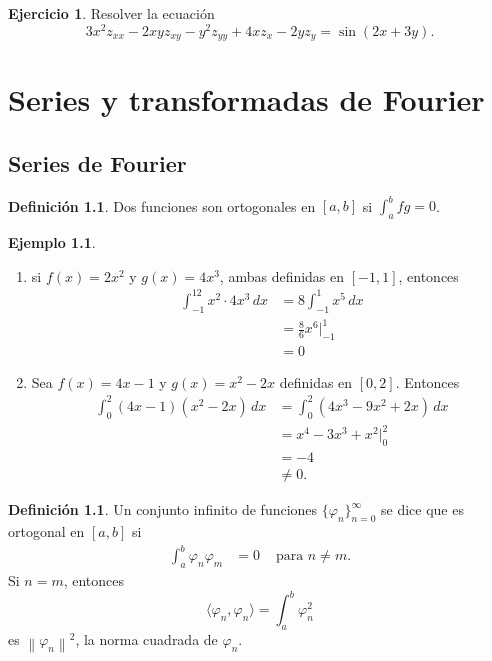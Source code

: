 \documentclass[11pt,letterpaper,draft]{report}
\theoremstyle{plain}
\theoremstyle{definition}
\newtheorem{definition}[theorem]{Definición}
\newtheorem{example}[theorem]{Ejemplo}
\newtheorem{exercise}[theorem]{Ejercicio}
\theoremstyle{remark}
\newcommand\norm[1]{\left\|#1\right\|}
\newcommand\<{\langle}
\renewcommand\>{\rangle}
\renewcommand\phi\varphi
\begin{document}
\begin{exercise}
  Resolver la ecuación
  \[
  3x^2 z_{xx} - 2xy z_{xy} - y^2 z_{yy} + 4x z_x - 2y z_y =
  \sin(2x+3y).
  \] 
\end{exercise}

\chapter{Series y transformadas de Fourier}

\section{Series de Fourier}

\begin{definition}
  Dos funciones son ortogonales en $[a,b]$ si $\int_a^bfg=0$.
\end{definition}
\begin{example}
  \begin{enumerate}
    \item si $f(x)=2x^2$ y $g(x)=4x^3$, ambas definidas en
    $[-1,1]$, entonces
    \begin{align*}
      \int_{-1}^12x^2\cdot 4x^3\,dx
      &= 8\int_{-1}^1x^5\,dx \\
      &= \frac{8}{6}x^6|_{-1}^1 \\
      &= 0
    \end{align*}
    \item Sea $f(x)=4x-1$ y $g(x)=x^2-2x$ definidas en $[0,2]$.
    Entonces
    \begin{align*}
      \int_0^2(4x-1)(x^2-2x)\,dx
      &= \int_0^2(4x^3-9x^2+2x)\,dx \\
      &= x^4-3x^3+x^2 |_0^2 \\
      &= -4 \\
      &\neq 0.
    \end{align*}
  \end{enumerate}
\end{example}

\begin{definition}
  Un conjunto infinito de funciones $\{\phi_n\}_{n=0}^\infty$ se
  dice que es ortogonal en $[a,b]$ si
  \begin{align*}
    \int_a^b\phi_n\phi_m &= 0 & \text{ para } n\neq m.
  \end{align*}
  Si $n=m$, entonces
  \[
    \<\phi_n,\phi_n\> = \int_a^b \phi_n^2
  \]
  es $\norm{\phi_n}^{2}$, la norma cuadrada de $\phi_n$.
\end{definition}
\end{document}
